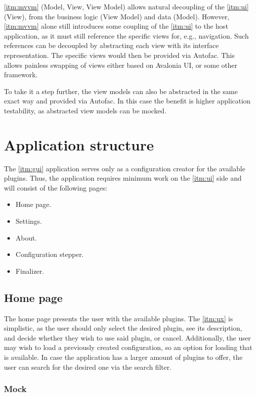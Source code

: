 \ref{itm:mvvm} (Model, View, View Model) allows natural decoupling of the \ref{itm:ui} (View), from the business logic (View Model) and data (Model). However, \ref{itm:mvvm} alone still introduces some coupling of the \ref{itm:ui} to the host application, as it must still reference the specific views for, e.g., navigation. Such references can be decoupled by abstracting each view with its interface representation. The specific views would then be provided via Autofac. This allows painless swapping of views either based on Avalonia UI, or some other framework.

To take it a step further, the view models can also be abstracted in the same exact way and provided via Autofac. In this case the benefit is higher application testability, as abstracted view models can be mocked.

\section{Application structure}

The \ref{itm:gui} application serves only as a configuration creator for the available plugins. Thus, the application requires minimum work on the \ref{itm:ui} side and will consist of the following pages:
\begin{itemize}
    \item Home page.
    \item Settings.
    \item About.
    \item Configuration stepper.
    \item Finalizer.
\end{itemize}

\subsection{Home page}

The home page presents the user with the available plugins. The \ref{itm:ux} is simplistic, as the user should only select the desired plugin, see its description, and decide whether they wish to use said plugin, or cancel.
Additionally, the user may wish to load a previously created configuration, so an option for loading that is available.
In case the application has a larger amount of plugins to offer, the user can search for the desired one via the search filter.

\subsubsection{Mock}

